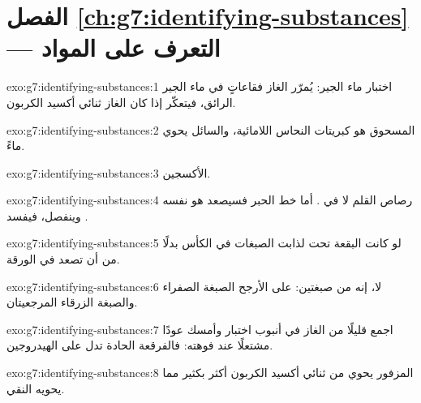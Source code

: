 \section*{الفصل \ref{ch:g7:identifying-substances} --- التعرف على المواد}

\begin{solution}{exo:g7:identifying-substances:1}
اختبار ماء الجير: يُمرّر الغاز فقاعاتٍ في ماء الجير الرائق، فيتعكّر إذا كان
الغاز ثنائي أكسيد الكربون.
\end{solution}

\begin{solution}{exo:g7:identifying-substances:2}
المسحوق هو كبريتات النحاس اللامائية، والسائل يحوي ماءً.
\end{solution}

\begin{solution}{exo:g7:identifying-substances:3}
الأكسجين.
\end{solution}

\begin{solution}{exo:g7:identifying-substances:4}
رصاص القلم لا  في . أما خط الحبر فسيصعد هو نفسه وينفصل،
فيفسد .
\end{solution}

\begin{solution}{exo:g7:identifying-substances:5}
لو كانت البقعة تحت  لذابت الصبغات في  الكأس بدلًا من أن
تصعد في الورقة.
\end{solution}

\begin{solution}{exo:g7:identifying-substances:6}
لا، إنه  من صبغتين: على الأرجح الصبغة الصفراء والصبغة الزرقاء
المرجعيتان.
\end{solution}

\begin{solution}{exo:g7:identifying-substances:7}
اجمع قليلًا من الغاز في أنبوب اختبار وأمسك عودًا مشتعلًا عند فوهته: فالفرقعة
الحادة تدل على الهيدروجين.
\end{solution}

\begin{solution}{exo:g7:identifying-substances:8}
 المزفور يحوي من ثنائي أكسيد الكربون أكثر بكثير مما يحويه  النقي.
\end{solution}

